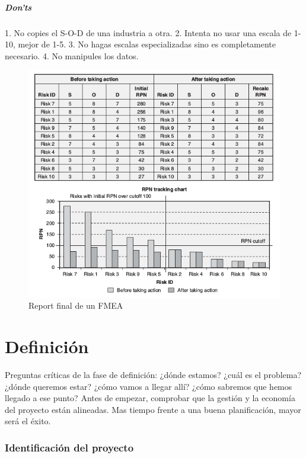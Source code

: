 \documentclass[]{article}
\begin{document}
\subsubsection{Don'ts} 1. No copies el S-O-D de una industria a otra. 2. Intenta no usar una escala de 1-10, mejor de 1-5. 3. No hagas escalas especializadas sino es completamente necesario. 4. No manipules los datos.

\begin{figure}[ht!]
	\centering
	\includegraphics[width=140mm]{imagenes/FMEAPrePos.png}
	\caption{Report final de un FMEA}
	\label{fig:FMEAPrePos}
\end{figure}
\pagebreak[4]
\part{Definición}

Preguntas críticas de la fase de definición: ¿dónde estamos? ¿cuál es el problema? ¿dónde queremos estar? ¿cómo vamos a llegar allí? ¿cómo sabremos que hemos llegado a ese punto? \newline Antes de empezar, comprobar que la gestión y la economía del proyecto están alineadas. Mas tiempo frente a una buena planificación, mayor será el éxito. 

\section{Identificación del proyecto}
\end{document}

